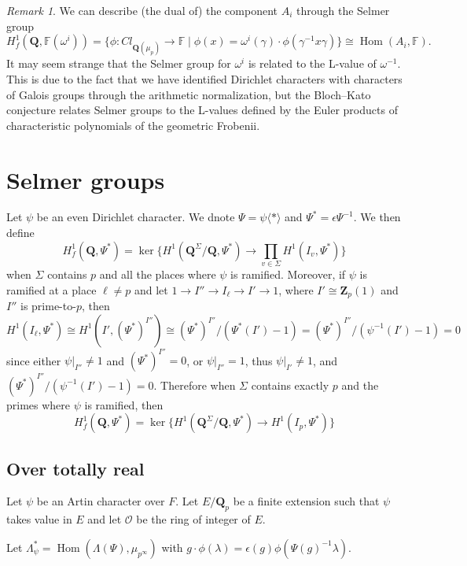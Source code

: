 \documentclass[leqno]{amsart}
\theoremstyle{definition}
\theoremstyle{remark}
\newtheorem{rem}[thm]{Remark}
\newcommand{\oo}{\mathcal{O}}
\newcommand{\Q}{{\mathbf{Q}}}
\newcommand{\Qp}{\mathbf{Q}_p}
\newcommand{\Zp}{\mathbf{Z}_p}
\DeclareMathOperator{\Hom}{Hom}
\begin{document}
\begin{rem}
	We can describe (the dual of) the component $A_i$
	through the Selmer group
	\[
	H^1_f(\Q, \mathbb{F}(\omega^i))
	=\{\phi\colon Cl_{\Q(\mu_p)}\to \mathbb{F}\mid
	\phi(x)=\omega^i(\gamma)\cdot \phi(\gamma^{-1}x \gamma)\}
	\cong \Hom(A_i,\mathbb{F}).
	\]
	It may seem strange that the Selmer group for $\omega^i$
	is related to the L-value of $\omega^{-1}$.
	This is due to the fact that we have identified
	Dirichlet characters with characters of Galois groups
	through the arithmetic normalization,
	but the Bloch--Kato conjecture
	relates Selmer groups to the L-values
	defined by the Euler products of characteristic polynomials
	of the geometric Frobenii.
\end{rem}


\section{Selmer groups}



Let $\psi$ be an even Dirichlet character.
We dnote $\Psi=\psi\langle*\rangle$
and $\Psi^*=\epsilon \Psi^{-1}$.
We then define
\[
	H_f^1(\Q,\Psi^*)=\ker
	\bigg\{
		H^1(\Q^\Sigma/\Q,\Psi^*)\to
		\prod_{v\in \Sigma}H^1(I_v,\Psi^*)
	\bigg\}
\]
when $\Sigma$ contains $p$ and all the places where
$\psi$ is ramified. 
Moreover, if $\psi$ is ramified at a place $\ell\neq p$
and let $1\to I''\to I_\ell\to I'\to 1$,
where $I'\cong \Zp(1)$
and $I''$ is prime-to-$p$, then
\[
	H^1(I_\ell,\Psi^*)\cong H^1(I',(\Psi^*)^{I''})\cong
	(\Psi^*)^{I''}/(\Psi^*(I')-1)=
	(\Psi^*)^{I''}/(\psi^{-1}(I')-1)=0
\]
since either $\psi\vert_{I''}\neq 1$ and $(\Psi^*)^{I''}=0$,
or $\psi\vert_{I''}= 1$, thus
$\psi\vert_{I'}\neq 1$, and
$(\Psi^*)^{I''}/(\psi^{-1}(I')-1)=0$.
Therefore when $\Sigma$ contains exactly $p$ 
and the primes where $\psi$ is ramified, then 
\[
	H_f^1(\Q,\Psi^*)=\ker
	\bigg\{
		H^1(\Q^\Sigma/\Q,\Psi^*)\to
		H^1(I_p,\Psi^*)
	\bigg\}
\]

\subsection{Over totally real}

Let $\psi$ be an Artin character over $F$.
Let $E/\Qp$ be a finite extension such that
$\psi$ takes value in $E$
and let  $\oo$ be the ring of integer of  $E$.

Let $\Lambda^*_\psi=\Hom(\Lambda(\Psi),\mu_{p^\infty})$
with $g\cdot \phi(\lambda)=\epsilon(g)\phi(\Psi(g)^{-1}\lambda)$.
\end{document}
